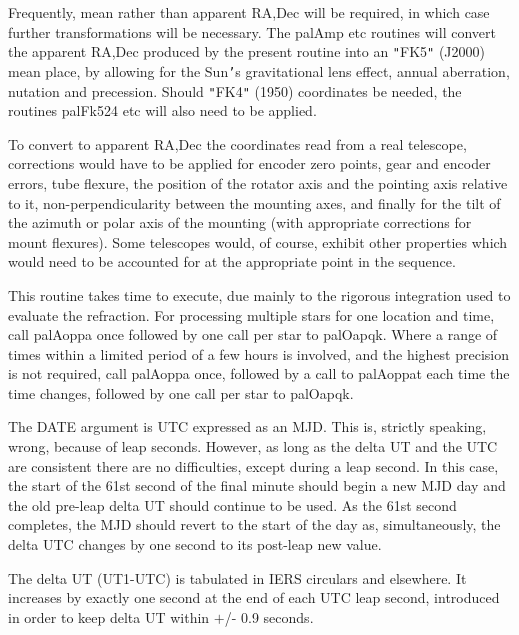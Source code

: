 \documentclass[twoside,11pt]{article}
\renewcommand{\_}{\texttt{\symbol{95}}}
\newcommand{\sstitem}{\item}
\newcommand{\sstitem}{\item}
\begin{document}
{{{         \sstitem
         Frequently, mean rather than apparent RA,Dec will be required,
         in which case further transformations will be necessary.  The
         palAmp etc routines will convert the apparent RA,Dec produced
         by the present routine into an {\tt "}FK5{\tt "} (J2000) mean place, by
         allowing for the Sun{\tt '}s gravitational lens effect, annual
         aberration, nutation and precession.  Should {\tt "}FK4{\tt "} (1950)
         coordinates be needed, the routines palFk524 etc will also
         need to be applied.

         \sstitem
         To convert to apparent RA,Dec the coordinates read from a
         real telescope, corrections would have to be applied for
         encoder zero points, gear and encoder errors, tube flexure,
         the position of the rotator axis and the pointing axis
         relative to it, non-perpendicularity between the mounting
         axes, and finally for the tilt of the azimuth or polar axis
         of the mounting (with appropriate corrections for mount
         flexures).  Some telescopes would, of course, exhibit other
         properties which would need to be accounted for at the
         appropriate point in the sequence.

         \sstitem
         This routine takes time to execute, due mainly to the rigorous
         integration used to evaluate the refraction.  For processing
         multiple stars for one location and time, call palAoppa once
         followed by one call per star to palOapqk.  Where a range of
         times within a limited period of a few hours is involved, and the
         highest precision is not required, call palAoppa once, followed
         by a call to palAoppat each time the time changes, followed by
         one call per star to palOapqk.

         \sstitem
         The DATE argument is UTC expressed as an MJD.  This is, strictly
         speaking, wrong, because of leap seconds.  However, as long as
         the delta UT and the UTC are consistent there are no
         difficulties, except during a leap second.  In this case, the
         start of the 61st second of the final minute should begin a new
         MJD day and the old pre-leap delta UT should continue to be used.
         As the 61st second completes, the MJD should revert to the start
         of the day as, simultaneously, the delta UTC changes by one
         second to its post-leap new value.

         \sstitem
         The delta UT (UT1-UTC) is tabulated in IERS circulars and
         elsewhere.  It increases by exactly one second at the end of
         each UTC leap second, introduced in order to keep delta UT
         within $+$/- 0.9 seconds.

}}}
\end{document}

